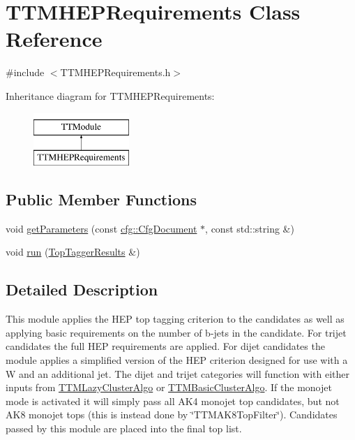 \hypertarget{classTTMHEPRequirements}{\section{T\-T\-M\-H\-E\-P\-Requirements Class Reference}
\label{classTTMHEPRequirements}
}


{\ttfamily \#include $<$T\-T\-M\-H\-E\-P\-Requirements.\-h$>$}

Inheritance diagram for T\-T\-M\-H\-E\-P\-Requirements\-:\begin{figure}[H]
\begin{center}
\leavevmode
\includegraphics[height=2.000000cm]{classTTMHEPRequirements}
\end{center}
\end{figure}
\subsection*{Public Member Functions}
\begin{DoxyCompactItemize}
\item 
void \hyperlink{classTTMHEPRequirements_ad86f4c8dc3dfc9b2a3925892e9ea82ec}{get\-Parameters} (const \hyperlink{classcfg_1_1CfgDocument}{cfg\-::\-Cfg\-Document} $\ast$, const std\-::string \&)
\item 
void \hyperlink{classTTMHEPRequirements_a5815a6c66595320c1d0f0f006dd67a4d}{run} (\hyperlink{classTopTaggerResults}{Top\-Tagger\-Results} \&)
\end{DoxyCompactItemize}


\subsection{Detailed Description}
This module applies the H\-E\-P top tagging criterion to the candidates as well as applying basic requirements on the number of b-\/jets in the candidate. For trijet candidates the full H\-E\-P requirements are applied. For dijet candidates the module applies a simplified version of the H\-E\-P criterion designed for use with a W and an additional jet. The dijet and trijet categories will function with either inputs from \hyperlink{classTTMLazyClusterAlgo}{T\-T\-M\-Lazy\-Cluster\-Algo} or \hyperlink{classTTMBasicClusterAlgo}{T\-T\-M\-Basic\-Cluster\-Algo}. If the monojet mode is activated it will simply pass all A\-K4 monojet top candidates, but not A\-K8 monojet tops (this is instead done by \char`\"{}\-T\-T\-M\-A\-K8\-Top\-Filter\char`\"{}). Candidates passed by this module are placed into the final top list.


